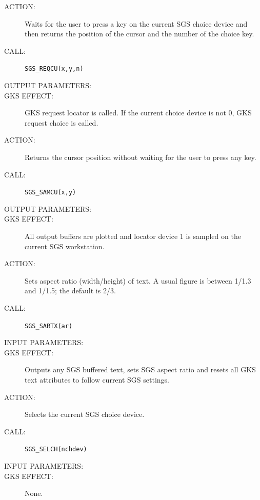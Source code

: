 \documentclass[11pt]{article}
\begin{document}
\begin{description}
\item [ACTION:]
Waits for the user to press a key on the current SGS choice device
and then returns the position of the cursor and the number of the choice key.
\item [CALL:]
{\tt SGS\_REQCU(x,y,n)}
\item [OUTPUT PARAMETERS:]
\begin{params}
\end{params}
\item [GKS EFFECT:]
GKS request locator is called.
If the current choice device is not 0, GKS request choice is called.
\end{description}
\goodbreak

\begin{description}
\item [ACTION:]
Returns the cursor position without waiting for the user to press any key.
\item [CALL:]
{\tt SGS\_SAMCU(x,y)}
\item [OUTPUT PARAMETERS:]
\begin{params}
\end{params}
\item [GKS EFFECT:]
All output buffers are plotted and locator device 1 is sampled on the
current SGS workstation.
\end{description}
\goodbreak

\begin{description}
\item [ACTION:]
Sets aspect ratio (width/height) of text.
A usual figure is between 1/1.3 and 1/1.5; the default is 2/3.
\item [CALL:]
{\tt SGS\_SARTX(ar)}
\item [INPUT PARAMETERS:]
\begin{params}
\end{params}
\item [GKS EFFECT:]
Outputs any SGS buffered text, sets SGS aspect ratio and resets all GKS text
attributes to follow current SGS settings.
\end{description}
\goodbreak

\begin{description}
\item [ACTION:]
Selects the current SGS choice device.
\item [CALL:]
{\tt SGS\_SELCH(nchdev)}
\item [INPUT PARAMETERS:]
\begin{params}
\end{params}
\item [GKS EFFECT:]
None.
\end{description}
\goodbreak
\end{document}
